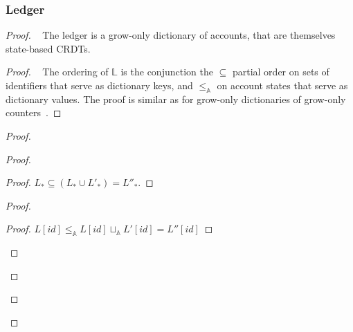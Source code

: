 \documentclass[9pt, oneside]{article}   	%
\begin{document}
\subsubsection{Ledger}



\label{th:ledger-crdt}
\begin{proof}
	\pfsketch~ The ledger is a grow-only dictionary of accounts, that are themselves state-based CRDTs.
	
	\begin{proof}
		\pfsketch~ The ordering of $\mathds{L}$ is the conjunction the $\subseteq$ partial order on sets of identifiers that serve as dictionary keys, and $\leq_\mathds{A}$ on account states that serve as dictionary values. The proof is similar as for grow-only dictionaries of grow-only counters~\cite{lavoie2023statebased}.
	\end{proof}
	
	\begin{proof}		
		\begin{proof}
			\begin{proof}
				$L_* \subseteq (L_* \cup L'_*) = L''_*$.
			\end{proof}
			
			\begin{proof}
				\begin{proof}
					$ L[\textit{id}] \leq_\mathds{A} L[\textit{id}] \sqcup_\mathds{A}  L'[\textit{id}]  = L''[\textit{id}]$
				\end{proof}
				

\end{proof}
\end{proof}
\end{proof}
\end{proof}
\end{document}
